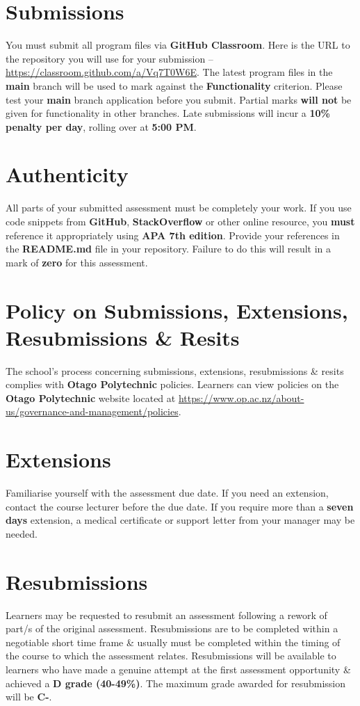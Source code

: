\documentclass{article}
\begin{document}
\section*{Submissions}
You must submit all program files via \textbf{GitHub Classroom}. Here is the URL to the repository you will use for your submission – \href{https://classroom.github.com/a/Vq7T0W6E}{https://classroom.github.com/a/Vq7T0W6E}. The latest program files in the \textbf{main} branch will be used to mark against the \textbf{Functionality} criterion. Please test your \textbf{main} branch application before you submit. Partial marks \textbf{will not} be given for functionality in other branches. Late submissions will incur a \textbf{10\% penalty per day}, rolling over at \textbf{5:00 PM}.

\section*{Authenticity}
All parts of your submitted assessment must be completely your work. If you use code snippets from \textbf{GitHub}, \textbf{StackOverflow} or other online resource, you \textbf{must} reference it appropriately using \textbf{APA 7th edition}. Provide your references in the \textbf{README.md} file in your repository. Failure to do this will result in a mark of \textbf{zero} for this assessment.

\section*{Policy on Submissions, Extensions, Resubmissions \& Resits}
The school's process concerning submissions, extensions, resubmissions \& resits complies with \textbf{Otago Polytechnic} policies. Learners can view policies on the \textbf{Otago Polytechnic} website located at \href{https://www.op.ac.nz/about-us/governance-and-management/policies}{https://www.op.ac.nz/about-us/governance-and-management/policies}.

\section*{Extensions}
Familiarise yourself with the assessment due date. If you need an extension, contact the course lecturer before the due date. If you require more than a \textbf{seven days} extension, a medical certificate or support letter from your manager may be needed.

\section*{Resubmissions}
Learners may be requested to resubmit an assessment following a rework of part/s of the original assessment. Resubmissions are to be completed within a negotiable short time frame \& usually must be completed within the timing of the course to which the assessment relates. Resubmissions will be available to learners who have made a genuine attempt at the first assessment opportunity \& achieved a \textbf{D grade (40-49\%)}. The maximum grade awarded for resubmission will be \textbf{C-}.
\end{document}
